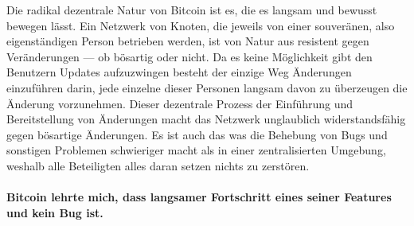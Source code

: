 Die radikal dezentrale Natur von Bitcoin ist es, die es langsam und bewusst
bewegen lässt. Ein Netzwerk von Knoten, die jeweils von einer souveränen, also
eigenständigen Person betrieben werden, ist von Natur aus resistent gegen
Veränderungen — ob bösartig oder nicht. Da es keine Möglichkeit gibt den
Benutzern Updates aufzuzwingen besteht der einzige Weg Änderungen einzuführen
darin, jede einzelne dieser Personen langsam davon zu überzeugen die Änderung
vorzunehmen. Dieser dezentrale Prozess der Einführung und Bereitstellung von
Änderungen macht das Netzwerk unglaublich widerstandsfähig gegen bösartige
Änderungen. Es ist auch das was die Behebung von Bugs und sonstigen Problemen
schwieriger macht als in einer zentralisierten Umgebung, weshalb alle
Beteiligten alles daran setzen nichts zu zerstören.

\paragraph{Bitcoin lehrte mich, dass langsamer Fortschritt eines seiner Features
und kein Bug ist.}

%
%
%
%
%
%
%
